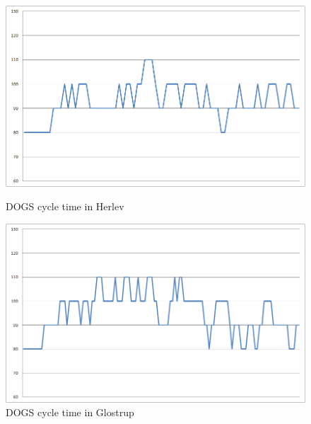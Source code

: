 \begin{figure}[ht]

    \begin{minipage}[b]{0.5\linewidth}

\centering
\includegraphics[scale=0.2]{C_dogs_herlev.png}
\caption{DOGS cycle time in Herlev}
\label{fig:c_dogs_herlev}

    \end{minipage}
    \hspace{0.1cm}
    \begin{minipage}[b]{0.5\linewidth}

\centering
\includegraphics[scale=0.2]{C_dogs_glostrup.png}
\caption{DOGS cycle time in Glostrup}
\label{fig:c_dogs_glostrup}

    \end{minipage}
    
        \begin{minipage}[b]{0.5\linewidth}


\end{minipage}
\end{figure}
